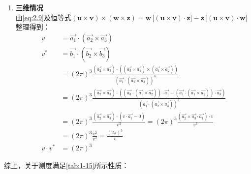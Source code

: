 \begin{enumerate}[itemsep=0pt,parsep=0pt]
        \item \textbf{三维情况}\\
        由\autoref{eq:2.9}及恒等式$
        (\mathbf{u} \times \mathbf{v}) \times (\mathbf{w} \times \mathbf{z})
        = \mathbf{w}\,\big[(\mathbf{u} \times \mathbf{v}) \cdot \mathbf{z}\big]
        - \mathbf{z}\,\big[(\mathbf{u} \times \mathbf{v}) \cdot \mathbf{w}\big]
        $整理得到：
        \begin{align*}
            v      &= \vec{a_1} \cdot (\vec{a_2}\times \vec{a_3})\\
            v^\ast &= \vec{b_1} \cdot (\vec{b_2}\times \vec{b_3})\\
                   &= (2\pi)^3 \frac{(\vec{a_2}\times \vec{a_3})\cdot ((\vec{a_3}\times \vec{a_1})\times (\vec{a_1}\times \vec{a_2}))}{(\vec{a_1}\cdot (\vec{a_2}\times \vec{a_3}))^3}\\
                   &= (2\pi)^3 \frac{(\vec{a_2}\times \vec{a_3})\cdot ((\vec{a_3}\cdot(\vec{a_1}\times \vec{a_2}))\cdot \vec{a_1}-(\vec{a_1}\cdot(\vec{a_1}\times \vec{a_2}))\cdot \vec{a_3})}{(\vec{a_1}\cdot (\vec{a_2}\times \vec{a_3}))^3}\\
                   &= (2\pi)^3 \frac{(\vec{a_2}\times \vec{a_3})\cdot (v\cdot \vec{a_1}-0)}{v^3}=(2\pi)^3 \frac{(\vec{a_2}\times \vec{a_3}\cdot \vec{a_1})\cdot v}{v^3}\\
                   &= (2\pi)^3 \frac{v^2}{v^3} = \frac{(2\pi)^3}{v}\\
            v\cdot v^\ast   &= (2\pi)^3
        \end{align*}
        
    \end{enumerate}

    综上，关于测度满足\autoref{tab:1-15}所示性质：
    \begin{table}[!htbp]
    \centering
    \caption{正格子与倒格子的测度}
    \label{tab:1-15}
    \end{table}

